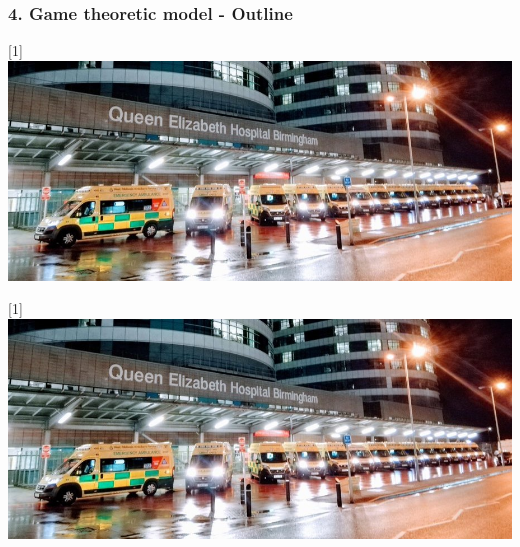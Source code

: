 \begin{frame}
    \frametitle{4. Game theoretic model - Outline}
    \centering
    \scalebox{-1}[1]{\includegraphics[scale=0.35]{Bin/articles/ambulance_queue.jpg}}
    \vspace{0.2cm}

    \scalebox{-1}[1]{\includegraphics[scale=0.35]{Bin/articles/ambulance_queue.jpg}}
\end{frame}


